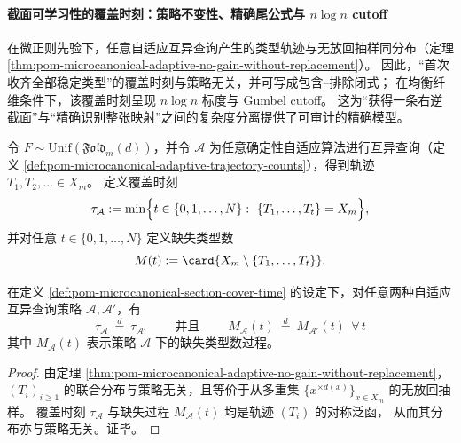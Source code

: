 \paragraph{截面可学习性的覆盖时刻：策略不变性、精确尾公式与 \texorpdfstring{$n\log n$}{n log n} cutoff}
在微正则先验下，任意自适应互异查询产生的类型轨迹与无放回抽样同分布（定理 \ref{thm:pom-microcanonical-adaptive-no-gain-without-replacement}）。
因此，“首次收齐全部稳定类型”的覆盖时刻与策略无关，并可写成包含--排除闭式；
在均衡纤维条件下，该覆盖时刻呈现 \(n\log n\) 标度与 Gumbel cutoff。
这为“获得一条右逆截面”与“精确识别整张映射”之间的复杂度分离提供了可审计的精确模型。

\begin{definition}[覆盖时刻与缺失类型数]\label{def:pom-microcanonical-section-cover-time}
令 \(F\sim\mathrm{Unif}(\mathfrak{Fold}_m(d))\)，并令 \(\mathcal{A}\) 为任意确定性自适应算法进行互异查询（定义 \ref{def:pom-microcanonical-adaptive-trajectory-counts}），得到轨迹 \(T_1,T_2,\dots\in X_m\)。
定义覆盖时刻
\[
\tau_{\mathcal A}:=\min\Bigl\{t\in\{0,1,\dots,N\}:\ \{T_1,\dots,T_t\}=X_m\Bigr\},
\]
并对任意 \(t\in\{0,1,\dots,N\}\) 定义缺失类型数
\[
M(t):=\card{X_m\setminus\{T_1,\dots,T_t\}}.
\]
\end{definition}

\begin{theorem}[覆盖时刻的策略不变性]\label{thm:pom-microcanonical-cover-time-strategy-invariance}
在定义 \ref{def:pom-microcanonical-section-cover-time} 的设定下，对任意两种自适应互异查询策略 \(\mathcal{A},\mathcal{A}'\)，有
\[
\boxed{\;
\tau_{\mathcal A}\ \stackrel{d}{=}\ \tau_{\mathcal A'}\;}
\qquad\text{并且}\qquad
\boxed{\;
M_{\mathcal A}(t)\ \stackrel{d}{=}\ M_{\mathcal A'}(t)\ \ \forall\,t\;}
\]
其中 \(M_{\mathcal A}(t)\) 表示策略 \(\mathcal A\) 下的缺失类型数过程。
\end{theorem}
\begin{proof}
由定理 \ref{thm:pom-microcanonical-adaptive-no-gain-without-replacement}，
\((T_i)_{i\ge 1}\) 的联合分布与策略无关，且等价于从多重集 \(\{x^{\times d(x)}\}_{x\in X_m}\) 的无放回抽样。
覆盖时刻 \(\tau_{\mathcal A}\) 与缺失过程 \(M_{\mathcal A}(t)\) 均是轨迹 \((T_i)\) 的对称泛函，
从而其分布亦与策略无关。证毕。
\end{proof}


